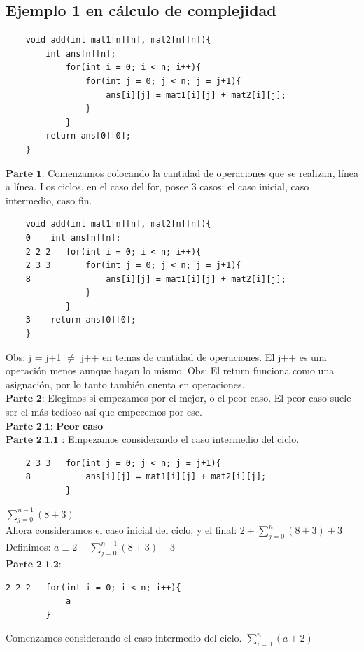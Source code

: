 \documentclass[10pt,a4paper]{article}
\begin{document}
\subsection*{Ejemplo 1 en cálculo de complejidad}
\begin{lstlisting}
    void add(int mat1[n][n], mat2[n][n]){
        int ans[n][n];
            for(int i = 0; i < n; i++){
                for(int j = 0; j < n; j = j+1){
                    ans[i][j] = mat1[i][j] + mat2[i][j];
                }
            }
        return ans[0][0];
    }
\end{lstlisting}
$\textbf{Parte 1}$: Comenzamos colocando la cantidad de operaciones que se realizan, línea a línea. Los ciclos, en el caso del for, posee 3 casos: el caso inicial, caso intermedio, caso fin.
\begin{lstlisting}
    void add(int mat1[n][n], mat2[n][n]){
    0    int ans[n][n];
    2 2 2   for(int i = 0; i < n; i++){
    2 3 3       for(int j = 0; j < n; j = j+1){
    8               ans[i][j] = mat1[i][j] + mat2[i][j];
                }
            }
    3    return ans[0][0];
    }
\end{lstlisting}
Obs: j = j+1 $\neq$ j++ en temas de cantidad de operaciones. El j++ es una operación menos aunque hagan lo mismo.
Obs: El return funciona como una asignación, por lo tanto también cuenta en operaciones. \\
$\textbf{Parte 2}$: Elegimos si empezamos por el mejor, o el peor caso. El peor caso suele ser el más tedioso así que empecemos por ese. \\
$\textbf{Parte 2.1: Peor caso}$ \\
$\textbf{Parte 2.1.1 }$: Empezamos considerando el caso intermedio del ciclo.
\begin{lstlisting}
    2 3 3   for(int j = 0; j < n; j = j+1){
    8           ans[i][j] = mat1[i][j] + mat2[i][j];
            }
\end{lstlisting}
$ \sum_{j=0}^{n-1}{(8+3)} $ \\
Ahora consideramos el caso inicial del ciclo, y el final: $ 2 + \sum_{j=0}^{n}{(8+3)} + 3$ \\
Definimos:  $a \equiv 2 + \sum_{j=0}^{n-1}{(8+3)} + 3$ \\
$\textbf{Parte 2.1.2}$: 
\begin{lstlisting}
2 2 2   for(int i = 0; i < n; i++){
            a
        }
\end{lstlisting}
Comenzamos considerando el caso intermedio del ciclo.
$ \sum_{i=0}^{n}{(a+2)} $ \\
\end{document}
